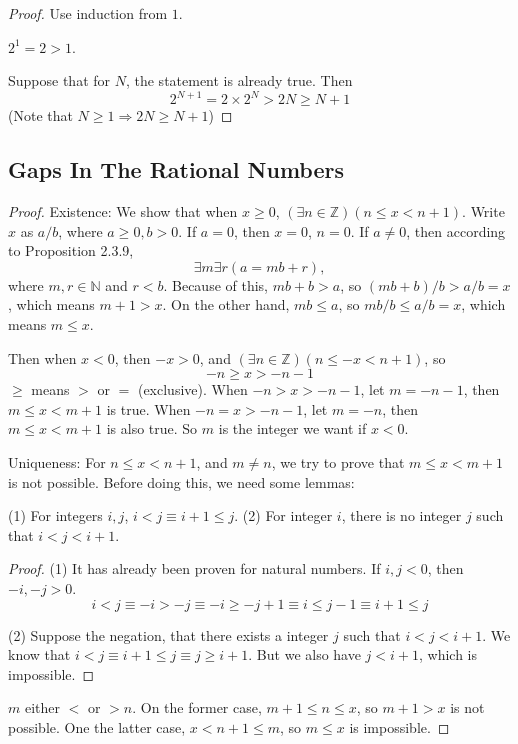 \begin{proof}
Use induction from $1$.

$2^1 = 2 >1$.

Suppose that for $N$, the statement is already true. Then
\[
2^{N+1} = 2\times 2^N > 2N \geq N+1
\]
(Note that $N\geq 1 \Longrightarrow 2N \geq N+1$)
\end{proof}

\subsection{Gaps In The Rational Numbers}
\begin{proof}
Existence: We show that when $x \geq 0$, $(\exists n \in \mathbb{Z})(n \leq x < n+1)$. Write $x$ as $a/b$, 
where $a \geq 0,b>0$. If $a= 0$, then $x=0$, $n=0$. If $a\neq 0$, then according to Proposition 2.3.9, 
\[
\exists m \exists r(a = mb+r),
\]
where $m,r \in \mathbb{N}$ and $r < b$. Because of this, $mb+b >a$, so $(mb+b)/b>a/b=x$, which means $m+1>x$. 
On the other hand, $mb \leq a$, so $mb/b \leq a/b =x$, which means $m \leq x$.

Then when $x<0$, then $-x>0$, and $(\exists n \in \mathbb{Z})(n \leq -x < n+1)$, so 
\[
-n \geq x > -n -1
\]
$\geq$ means $>$ or $=$ (exclusive). When $-n > x >-n-1$, let $m=-n-1$, then $m \leq x < m+1$ is true. When 
$-n =x > -n-1$, let $m=-n$, then $m \leq x < m+1$ is also true. So $m$ is the integer we want if $x<0$.

Uniqueness:
For $n \leq x < n+1$, and $m \neq n$, we try to prove that $m \leq x<m+1$ is not possible. Before doing this, 
we need some lemmas:
\begin{lem}
(1) For integers $i,j$, $i<j \equiv i+1\leq j$.
(2) For integer $i$, there is no integer $j$ such that $i<j<i+1$.
\end{lem}
\begin{proof}
(1) It has already been proven for natural numbers. If $i,j<0$, then $-i,-j>0$.
\[
i<j \equiv -i>-j \equiv -i \geq -j+1 \equiv i \leq j-1 \equiv i+1 \leq j
\]

(2)
Suppose the negation, that there exists a integer $j$ such that $i<j<i+1$. We know that 
$i<j \equiv i+1 \leq j \equiv j \geq i+1$. But we also have $j<i+1$, which is impossible.
\end{proof}

$m$ either $<$ or $>n$. On the former case, $m+1\leq n\leq x$, so $m+1>x$ is not possible. One the latter case, 
$x<n+1\leq m$, so $m \leq x$ is impossible.
\end{proof}

